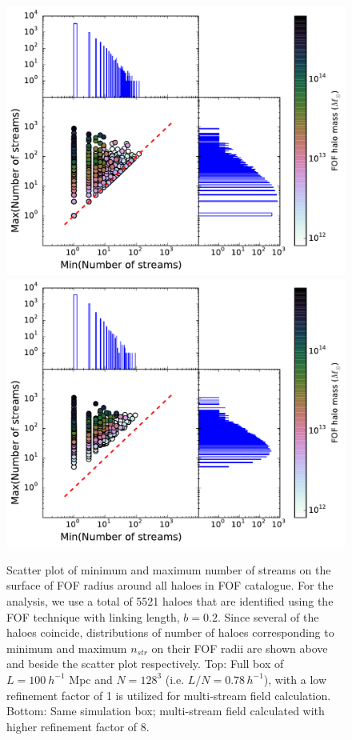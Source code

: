  
 \begin{figure}
\begin{minipage}[t]{.99\linewidth}
  \centering\includegraphics[width=10.cm]{Chapter3/Source_v2/fig11a}
\includegraphics[width=10.cm]{Chapter3/Source_v2/fig11b} 

\end{minipage}\hfill
\caption{Scatter plot of minimum and maximum number of streams on the surface of FOF radius around all haloes in FOF catalogue. For the analysis, we use a total of 5521 haloes that are identified using the FOF technique with linking length, $b=0.2$. Since several of the haloes coincide, distributions of number of haloes corresponding to minimum and maximum $n_{str}$ on their FOF radii are shown above and beside the scatter plot respectively. Top: Full box of $L =100 ~h^{-1}$ Mpc and $N = 128^3$ (i.e. $L/N = 0.78 \,h^{-1}$), with a low refinement factor of 1 is utilized for multi-stream field calculation. Bottom: Same simulation box; multi-stream field calculated with higher refinement factor of 8.}
\label{fig:minmax128}
\end{figure}

